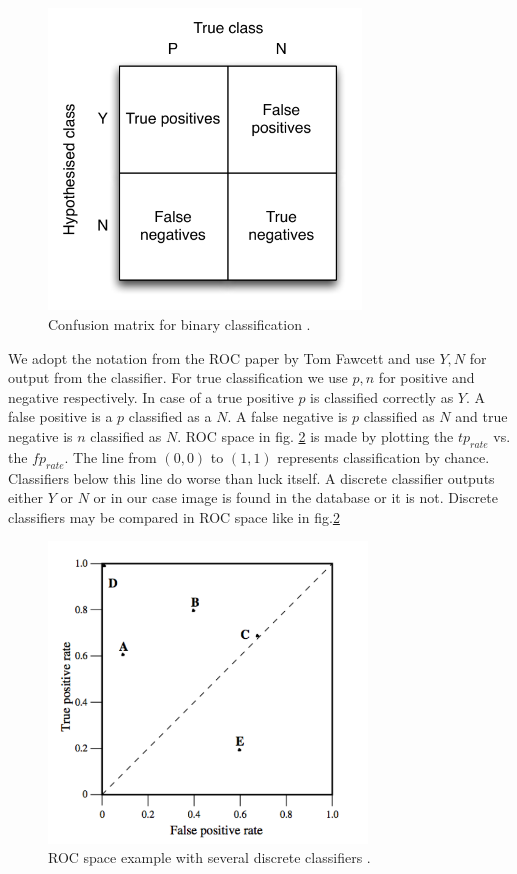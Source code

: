 \documentclass[english,12pt,a4paper,pdftex,elec,utf8]{aaltothesis}
\begin{document}
\begin{figure}[htb]
\begin{center}
\includegraphics[height=8cm]{figures/confusion}
\end{center}
\caption{Confusion matrix for binary classification \cite{Fawcett2006}. }
\label{figconfusion}
\end{figure}

We adopt the notation from the ROC paper by Tom Fawcett and use ${Y,N}$ for output from the classifier. For true classification we use ${p,n}$ for positive and negative respectively. In case of a true positive $p$ is classified correctly as $Y$. A false positive is a $p$ classified as a $N$. A false negative is $p$ classified as $N$ and true negative is $n$ classified as $N$. ROC space in fig. \ref{figrocspace} is made by plotting the $tp_{rate}$ vs. the $fp_{rate}$. The line from $(0,0)$ to $(1,1)$ represents classification by chance. Classifiers below this line do worse than luck itself. A discrete classifier outputs either $Y$ or $N$ or in our case image is found in the database or it is not. Discrete classifiers may be compared in ROC space like in fig.\ref{figrocspace} \cite{Fawcett2006}

\begin{figure}[htb]
\begin{center}
\includegraphics[height=8cm]{figures/ROC}
\end{center}
\caption{ROC space example with several discrete classifiers \cite{Fawcett2006}. }
\label{figrocspace}
\end{figure}
\end{document}
